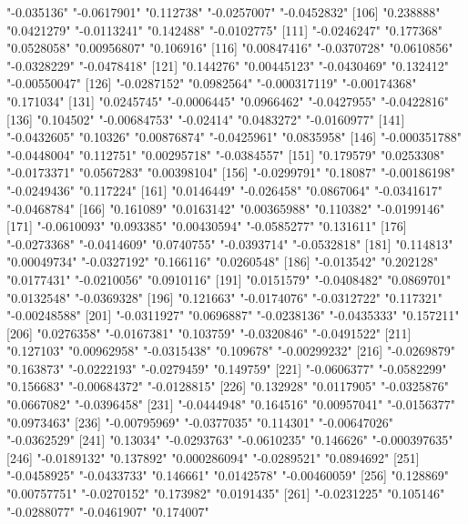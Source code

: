 \begin{Schunk}
\begin{Soutput}
[101] "-0.035136"    "-0.0617901"   "0.112738"     "-0.0257007"   "-0.0452832"  
[106] "0.238888"     "0.0421279"    "-0.0113241"   "0.142488"     "-0.0102775"  
[111] "-0.0246247"   "0.177368"     "0.0528058"    "0.00956807"   "0.106916"    
[116] "0.00847416"   "-0.0370728"   "0.0610856"    "-0.0328229"   "-0.0478418"  
[121] "0.144276"     "0.00445123"   "-0.0430469"   "0.132412"     "-0.00550047" 
[126] "-0.0287152"   "0.0982564"    "-0.000317119" "-0.00174368"  "0.171034"    
[131] "0.0245745"    "-0.0006445"   "0.0966462"    "-0.0427955"   "-0.0422816"  
[136] "0.104502"     "-0.00684753"  "-0.02414"     "0.0483272"    "-0.0160977"  
[141] "-0.0432605"   "0.10326"      "0.00876874"   "-0.0425961"   "0.0835958"   
[146] "-0.000351788" "-0.0448004"   "0.112751"     "0.00295718"   "-0.0384557"  
[151] "0.179579"     "0.0253308"    "-0.0173371"   "0.0567283"    "0.00398104"  
[156] "-0.0299791"   "0.18087"      "-0.00186198"  "-0.0249436"   "0.117224"    
[161] "0.0146449"    "-0.026458"    "0.0867064"    "-0.0341617"   "-0.0468784"  
[166] "0.161089"     "0.0163142"    "0.00365988"   "0.110382"     "-0.0199146"  
[171] "-0.0610093"   "0.093385"     "0.00430594"   "-0.0585277"   "0.131611"    
[176] "-0.0273368"   "-0.0414609"   "0.0740755"    "-0.0393714"   "-0.0532818"  
[181] "0.114813"     "0.00049734"   "-0.0327192"   "0.166116"     "0.0260548"   
[186] "-0.013542"    "0.202128"     "0.0177431"    "-0.0210056"   "0.0910116"   
[191] "0.0151579"    "-0.0408482"   "0.0869701"    "0.0132548"    "-0.0369328"  
[196] "0.121663"     "-0.0174076"   "-0.0312722"   "0.117321"     "-0.00248588" 
[201] "-0.0311927"   "0.0696887"    "-0.0238136"   "-0.0435333"   "0.157211"    
[206] "0.0276358"    "-0.0167381"   "0.103759"     "-0.0320846"   "-0.0491522"  
[211] "0.127103"     "0.00962958"   "-0.0315438"   "0.109678"     "-0.00299232" 
[216] "-0.0269879"   "0.163873"     "-0.0222193"   "-0.0279459"   "0.149759"    
[221] "-0.0606377"   "-0.0582299"   "0.156683"     "-0.00684372"  "-0.0128815"  
[226] "0.132928"     "0.0117905"    "-0.0325876"   "0.0667082"    "-0.0396458"  
[231] "-0.0444948"   "0.164516"     "0.00957041"   "-0.0156377"   "0.0973463"   
[236] "-0.00795969"  "-0.0377035"   "0.114301"     "-0.00647026"  "-0.0362529"  
[241] "0.13034"      "-0.0293763"   "-0.0610235"   "0.146626"     "-0.000397635"
[246] "-0.0189132"   "0.137892"     "0.000286094"  "-0.0289521"   "0.0894692"   
[251] "-0.0458925"   "-0.0433733"   "0.146661"     "0.0142578"    "-0.00460059" 
[256] "0.128869"     "0.00757751"   "-0.0270152"   "0.173982"     "0.0191435"   
[261] "-0.0231225"   "0.105146"     "-0.0288077"   "-0.0461907"   "0.174007"    

\end{Soutput}
\end{Schunk}
